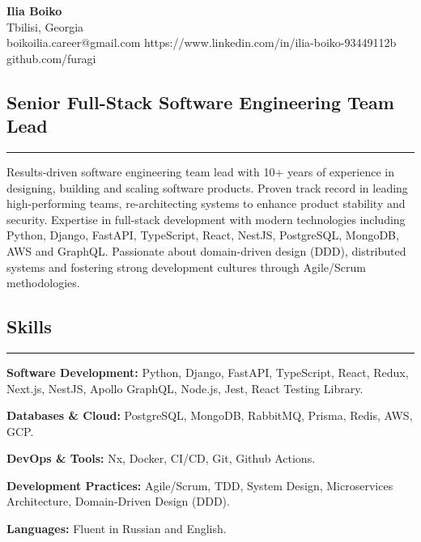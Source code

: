\documentclass[11pt,letterpaper]{article}
\begin{document}
\begin{center}
	{\LARGE \textbf{Ilia Boiko}}
	\\ Tbilisi, Georgia
	\vspace{0.05cm}
	\\
	\raisebox{-0.2\height}{\Large \faEnvelopeSquare} boikoilia.career@gmail.com \hfill \raisebox{-0.2\height}{\Large \faLinkedin} https://www.linkedin.com/in/ilia-boiko-93449112b \hfill \raisebox{-0.2\height}{\Large \faGithubSquare} github.com/furagi \hfill 
\end{center}

\subsection*{\Large Senior Full-Stack Software Engineering Team Lead}
\vspace{-.5em}
\hrule
\vspace{1em}
Results-driven software engineering team lead with 10+ years of experience in designing, building and scaling software products. Proven track record in leading high-performing teams, re-architecting systems to enhance product stability and security. Expertise in full-stack development with modern technologies including Python, Django, FastAPI, TypeScript, React, NestJS, PostgreSQL, MongoDB, AWS and GraphQL. Passionate about domain-driven design (DDD), distributed systems and fostering strong development cultures through Agile/Scrum methodologies.

\subsection*{\Large Skills}
\vspace{-.5em}
\hrule
\vspace{1em}
\begin{itemize*}
	\item {\textbf{Software Development:}} Python, Django, FastAPI, TypeScript, React, Redux, Next.js, NestJS, Apollo GraphQL,  Node.js, Jest, React Testing Library.
	\item {\textbf{Databases \& Cloud:}} PostgreSQL, MongoDB, RabbitMQ, Prisma, Redis, AWS, GCP.
	\item {\textbf{DevOps \& Tools:}} Nx, Docker, CI/CD, Git, Github Actions.
	\item {\textbf{Development Practices:}} Agile/Scrum, TDD, System Design, Microservices Architecture, Domain-Driven Design (DDD).
	\item {\textbf{Languages:}} Fluent in Russian and English.
\end{itemize*}
\end{document}
